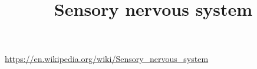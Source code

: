 \documentclass[a4paper]{article}
\title{Sensory nervous system}
\date{}
\begin{document}
    \maketitle

    \url{https://en.wikipedia.org/wiki/Sensory_nervous_system}
\end{document}
